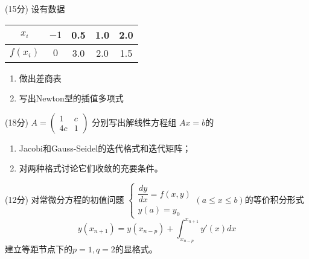 \documentclass[12pt,letter]{ustcexam}
\begin{document}
\begin{CJK*}{UTF8}{song}
\begin{problems}
\vspace*{0.4\textheight}

\qu (15分) 设有数据\begin{tabular}{c|cccc} $x_i$  & $ -1$ &0.5 & 1.0 &2.0
\\\hline $f(x_i)$ & $0$ & 3.0 &2.0 & 1.5
\end{tabular}
\begin{enumerate}
  \item 做出差商表
  \item 写出Newton型的插值多项式
\end{enumerate}

\newpage
\qu (18分) $A=\begin{pmatrix}1 & c \\ 4c & 1 \end{pmatrix}$ 分别写出解线性方程组
$Ax=b$的
\begin{enumerate}
  \item Jacobi和Gauss-Seidel的迭代格式和迭代矩阵；
  \item 对两种格式讨论它们收敛的充要条件。
\end{enumerate}

\newpage
\qu (12分)
对常微分方程的初值问题
$\left\{\begin{array}{l} \dfrac{dy}{dx}=f(x,y) \\ y(a)=y_0\end{array}\right. 
 (a\leqslant x \leqslant b)$的等价积分形式
$$y(x_{n+1})=y(x_{n-p})+\int_{x_{n-p}}^{x_{n+1}}y'(x)dx$$
建立等距节点下的$p=1,q=2$的显格式。

\newpage

\end{problems}


\clearpage
{}
\clearpage

\end{CJK*}
\end{document}
